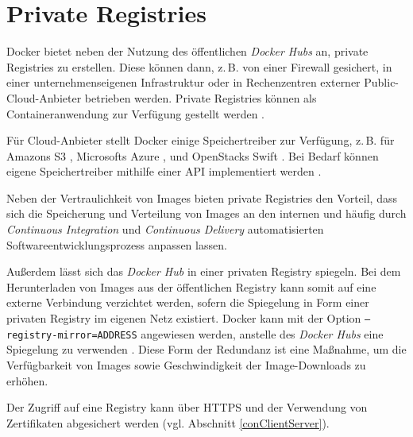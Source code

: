 \documentclass[../main.tex]{subfiles}
\begin{document}


  \section{Private Registries}
    Docker bietet neben der Nutzung des öffentlichen \emph{Docker Hubs} an, private Registries zu erstellen. Diese können dann, z.\,B. von einer Firewall gesichert, in einer unternehmenseigenen Infrastruktur oder in Rechenzentren externer Public-Cloud-Anbieter betrieben werden. Private Registries können als Containeranwendung zur Verfügung gestellt werden \cite{dockerRegistry}.

    Für Cloud-Anbieter stellt Docker einige Speichertreiber zur Verfügung, z.\,B. für Amazons S3 \cite{dockerStorageDriverS3}, Microsofts Azure \cite{dockerStorageDriverAzure}, und OpenStacks Swift \cite{dockerStorageDriverSwift}. Bei Bedarf können eigene Speichertreiber mithilfe einer API implementiert werden \cite{dockerStorageDriver}.

    Neben der Vertraulichkeit von Images bieten private Registries den Vorteil, dass sich die Speicherung und Verteilung von Images an den internen und häufig durch \emph{Continuous Integration} und \emph{Continuous Delivery} automatisierten Softwareentwicklungsprozess anpassen lassen.

    Außerdem lässt sich das \emph{Docker Hub} in einer privaten Registry spiegeln. Bei dem Herunterladen von Images aus der öffentlichen Registry kann somit auf eine externe Verbindung verzichtet werden, sofern die Spiegelung in Form einer privaten Registry im eigenen Netz existiert. Docker kann mit der Option \texttt{--registry-mirror=ADDRESS} angewiesen werden, anstelle des \emph{Docker Hubs} eine Spiegelung zu verwenden \cite{dockerRegistryMirror}. Diese Form der Redundanz ist eine Maßnahme, um die Verfügbarkeit von Images sowie Geschwindigkeit der Image-Downloads zu erhöhen.

    Der Zugriff auf eine Registry kann über \acrshort{HTTPS} und der Verwendung von Zertifikaten abgesichert werden \cite{dockerRegistry} (vgl. Abschnitt \ref{conClientServer}).
\end{document}
